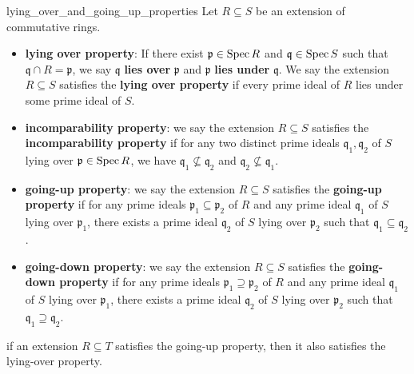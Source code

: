 \begin{definition}{}{lying_over_and_going_up_properties}
    Let $R\subseteq S$ be an extension of commutative rings.
    \begin{itemize}
        \item \textbf{lying over property}: If there exist $\mathfrak{p}\in \operatorname{Spec} R$ and $\mathfrak{q}\in \operatorname{Spec} S$ such that $\mathfrak{q}\cap R=\mathfrak{p}$, we say $\mathfrak{q}$ \textbf{lies over} $\mathfrak{p}$ and $\mathfrak{p}$ \textbf{lies under} $\mathfrak{q}$. We say the extension $R\subseteq S$ satisfies the \textbf{lying over property} if every prime ideal of $R$ lies under some prime ideal of $S$.
        \item \textbf{incomparability property}: we say the extension $R\subseteq S$ satisfies the \textbf{incomparability property} if for any two distinct prime ideals $\mathfrak{q}_1, \mathfrak{q}_2$ of $S$ lying over  $\mathfrak{p}\in \operatorname{Spec} R$, we have $\mathfrak{q}_1\not\subseteq \mathfrak{q}_2$ and $\mathfrak{q}_2\not\subseteq \mathfrak{q}_1$.
        \item \textbf{going-up property}: we say the extension $R\subseteq S$ satisfies the \textbf{going-up property} if for any prime ideals $\mathfrak{p}_1\subseteq \mathfrak{p}_2$ of $R$ and any prime ideal $\mathfrak{q}_1$ of $S$ lying over $\mathfrak{p}_1$, there exists a prime ideal $\mathfrak{q}_2$ of $S$ lying over $\mathfrak{p}_2$ such that $\mathfrak{q}_1\subseteq \mathfrak{q}_2$.
        \item \textbf{going-down property}: we say the extension $R\subseteq S$ satisfies the \textbf{going-down property} if for any prime ideals $\mathfrak{p}_1\supseteq \mathfrak{p}_2$ of $R$ and any prime ideal $\mathfrak{q}_1$ of $S$ lying over $\mathfrak{p}_1$, there exists a prime ideal $\mathfrak{q}_2$ of $S$ lying over $\mathfrak{p}_2$ such that $\mathfrak{q}_1\supseteq \mathfrak{q}_2$.
    \end{itemize}
\end{definition}

\begin{proposition}{}{}
    if an extension $R \subseteq  T$ satisfies the going-up property, then it also satisfies the lying-over property.
\end{proposition}

